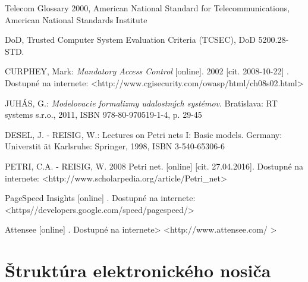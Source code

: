 \documentclass[12pt, oneside]{book}
\makeatletter
\def\@zoznamPri{Pr\'{i}lohy}
\makeatother
\begin{document}
\begin{thebibliography}{5}
Telecom Glossary 2000, American National Standard for Telecommunications, American National Standards Institute

DoD, Trusted Computer System Evaluation Criteria (TCSEC), DoD 5200.28-STD.

CURPHEY, Mark:\textit{ Mandatory Access Control} [online]. 2002 [cit. 2008-10-22] .
 Dostupné na internete: <http://www.cgisecurity.com/owasp/html/ch08s02.html>

JUHÁS, G.: \textit{Modelovacie formalizmy udalostných systémov}. Bratislava: RT systems
s.r.o., 2011, ISBN 978-80-970519-1-4, p. 29-45	

DESEL, J. - REISIG, W.: Lectures on Petri nets I: Basic models. Germany: Universtit
ät Karlsruhe: Springer, 1998, ISBN 3-540-65306-6

PETRI, C.A. - REISIG, W. 2008 Petri net. [online] [cit. 27.04.2016]. Dostupné na internete:
 <http://www.scholarpedia.org/article/Petri\_net>
 
 PageSpeed Insights [online] . Dostupné na internete:  <https//developers.google.com/speed/pagespeed/>
 
  Attensee [online] . Dostupné na internete> <http://www.attensee.com/ >



\end{thebibliography}



%
%
%
%

\newpage
\renewcommand \thesection{\Alph{section}}
\setcounter{section}{0}
\setcounter{subsection}{0}
\setcounter{subsubsection}{0}
\renewcommand \thetable{\Alph{section}}
\setcounter{table}{0}
\setcounter{figure}{0}
\setcounter{page}{1}  
\cleardoublepage
\addcontentsline{toc}{section}{\@zoznamPri}

\section{Štruktúra elektronického nosiča}
\end{document}
